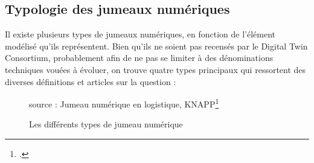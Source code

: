  \subsection{Typologie des jumeaux numériques }

 Il existe plusieurs types de jumeaux numériques, en fonction de l’élément modélisé qu’ils représentent. Bien qu'ils ne soient pas recensés par le Digital Twin Consortium, probablement afin de ne pas se limiter à des dénominations techniques vouées à évoluer, on trouve quatre types principaux qui ressortent des diverses définitions et articles sur la question :\\

\begin{figure}[ht]
    \centering
    \caption{Les différents types de jumeau numérique}
    {source : Jumeau numérique en logistique, KNAPP\footcite{JumeauNumeriqueLogistique2023}}
\end{figure}

